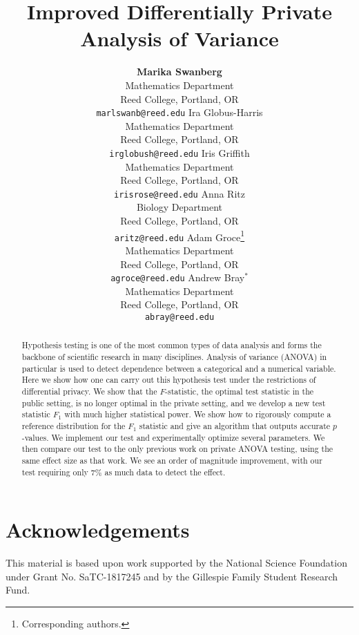 \documentclass[USenglish,oneside]{article}
\title{ Improved Differentially Private Analysis of Variance}
\author{
\textbf{Marika Swanberg}\\
Mathematics Department\\
Reed College, Portland, OR\\
\texttt{marlswanb@reed.edu}
\And
Ira Globus-Harris\\
Mathematics Department\\
Reed College, Portland, OR\\
 \texttt{irglobush@reed.edu}
 \And
 Iris Griffith\\
Mathematics Department\\
Reed College, Portland, OR\\
 \texttt{irisrose@reed.edu}
 \And
 Anna Ritz\\
Biology Department\\
Reed College, Portland, OR\\
 \texttt{aritz@reed.edu}
 \And
 Adam Groce\thanks{Corresponding authors.}\\
Mathematics Department\\
Reed College, Portland, OR\\
 \texttt{agroce@reed.edu} 
 \And
 Andrew Bray$^*$\\
Mathematics Department\\
Reed College, Portland, OR\\
\texttt{abray@reed.edu}
}
\date{}
\begin{document}
\maketitle

\begin{abstract}
{Hypothesis testing is one of the most common types of data analysis and forms the backbone of scientific research in many disciplines.  Analysis of variance (ANOVA) in particular is used to detect dependence between a categorical and a numerical variable.  Here we show how one can carry out this hypothesis test under the restrictions of differential privacy.  We show that the $F$-statistic, the optimal test statistic in the public setting, is no longer optimal in the private setting, and we develop a new test statistic $F_1$ with much higher statistical power.  We show how to rigorously compute a reference distribution for the $F_1$ statistic and give an algorithm that outputs accurate $p$-values.  We implement our test and experimentally optimize several parameters.  We then compare our test to the only previous work on private ANOVA testing, using the same effect size as that work.  We see an order of magnitude improvement, with our test requiring only 7\% as much data to detect the effect.}
\end{abstract}







\section*{Acknowledgements}
This material is based upon work supported by the National Science Foundation under Grant No. SaTC-1817245 and by the Gillespie Family Student Research Fund.




\appendix





\end{document}
